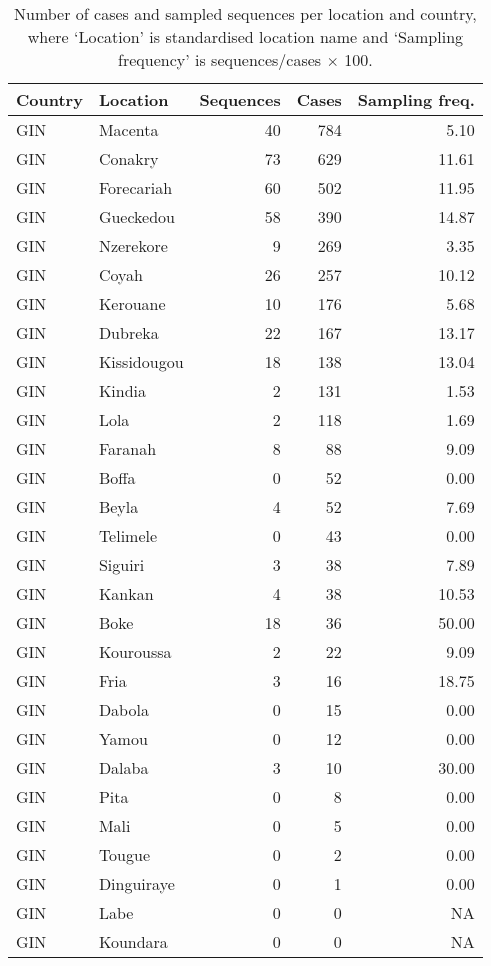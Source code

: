 \documentclass[11pt,oneside,letterpaper]{article}
\begin{document}
\begin{longtable}{ | l | l | r | r | r | }
\caption{Number of cases and sampled sequences per location and country, where `Location' is standardised location name and `Sampling frequency' is sequences/cases $\times$ 100.}
\label{caseTable}\\
\hline
Country & Location & Sequences & Cases & Sampling freq.\\ 
\hline
GIN & Macenta & 40 & 784 & 5.10 \\
GIN & Conakry & 73 & 629 & 11.61 \\
GIN & Forecariah & 60 & 502 & 11.95 \\
GIN & Gueckedou & 58 & 390 & 14.87 \\
GIN & Nzerekore & 9 & 269 & 3.35 \\
GIN & Coyah & 26 & 257 & 10.12 \\
GIN & Kerouane & 10 & 176 & 5.68 \\
GIN & Dubreka & 22 & 167 & 13.17 \\
GIN & Kissidougou & 18 & 138 & 13.04 \\
GIN & Kindia & 2 & 131 & 1.53 \\
GIN & Lola & 2 & 118 & 1.69 \\
GIN & Faranah & 8 & 88 & 9.09 \\
GIN & Boffa & 0 & 52 & 0.00 \\
GIN & Beyla & 4 & 52 & 7.69 \\
GIN & Telimele & 0 & 43 & 0.00 \\
GIN & Siguiri & 3 & 38 & 7.89 \\
GIN & Kankan & 4 & 38 & 10.53 \\
GIN & Boke & 18 & 36 & 50.00 \\
GIN & Kouroussa & 2 & 22 & 9.09 \\
GIN & Fria & 3 & 16 & 18.75 \\
GIN & Dabola & 0 & 15 & 0.00 \\
GIN & Yamou & 0 & 12 & 0.00 \\
GIN & Dalaba & 3 & 10 & 30.00 \\
GIN & Pita & 0 & 8 & 0.00 \\
GIN & Mali & 0 & 5 & 0.00 \\
GIN & Tougue & 0 & 2 & 0.00 \\
GIN & Dinguiraye & 0 & 1 & 0.00 \\
GIN & Labe & 0 & 0 & NA \\
GIN & Koundara & 0 & 0 & NA \\

\end{longtable}
\end{document}
